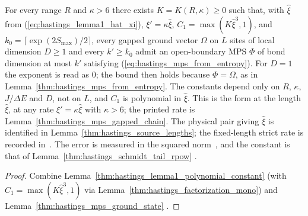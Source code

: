\begin{lemma}
    \label{thm:hastings_mps_gapped_chain_rate}
    \leanok
    For every range $R$ and $\kappa>6$ there exists $K=K(R,\kappa)\ge0$ such
    that, with $\hat\xi$ from (\ref{eq:hastings_lemma1_hat_xi}),
    $\xi'=\kappa\hat\xi$, $C_1=\max(K\hat\xi^3,1)$, and
    $k_0=\lceil\exp(2S_{\max})/2\rceil$, every gapped ground vector $\Omega$ on
    $L$ sites of local dimension $D\ge1$ and every $k'\ge k_0$ admit an
    open-boundary MPS $\Phi$ of bond dimension at most $k'$ satisfying
    (\ref{eq:hastings_mps_from_entropy}).
    For $D=1$ the exponent is read as $0$; the bound then holds because
    $\Phi=\Omega$, as in Lemma~\ref{thm:hastings_mps_from_entropy}.
    The constants depend only on $R$, $\kappa$, $J/\Delta E$ and $D$, not on
    $L$, and $C_1$ is polynomial in $\hat\xi$. This is the form at the length
    $\hat\xi$, at any rate $\xi'=\kappa\hat\xi$ with $\kappa>6$; the printed
    rate is Lemma~\ref{thm:hastings_mps_gapped_chain}. The physical pair giving $\hat\xi$ is identified in
    Lemma~\ref{thm:hastings_source_lengths}; the fixed-length strict rate is
    recorded in~\cite{gap:hastings07_gaussian_average_exponent}.
    The error is measured in the squared
    norm~\cite{gap:hastings07_mps_error_measure}, and the constant is that of
    Lemma~\ref{thm:hastings_schmidt_tail_rpow}
    \cite{gap:hastings07_schmidt_tail_constant}.
\end{lemma}
\begin{proof}\leanok
    Combine Lemma~\ref{thm:hastings_lemma1_polynomial_constant} (with
    $C_1=\max(K\hat\xi^3,1)$ via Lemma~\ref{thm:hastings_factorization_mono})
    and Lemma~\ref{thm:hastings_mps_ground_state}
    \cite{gap:hastings07_mps_entropy_stage}.
\end{proof}



